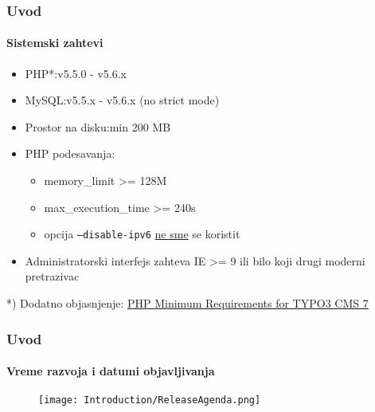\begin{frame}[fragile]
	\frametitle{Uvod}
	\framesubtitle{Sistemski zahtevi}

	\begin{itemize}
		\item PHP*:\tabto{3cm}v5.5.0 - v5.6.x
		\item MySQL:\tabto{3cm}v5.5.x - v5.6.x (no strict mode)
		\item Prostor na disku:\tabto{3cm}min 200 MB
		\item PHP podesavanja:

			\begin{itemize}
				\item memory\_limit >= 128M
				\item max\_execution\_time >= 240s
				\item opcija \texttt{--disable-ipv6} \underline{ne sme} se koristit
			\end{itemize}

		\item Administratorski interfejs zahteva IE >= 9 ili bilo koji drugi moderni pretrazivac

	\end{itemize}

	\vspace{1cm}
	*) Dodatno objasnjenje: \href{http://typo3.org/news/article/php-minimum-requirements-for-typo3-cms-7/}{PHP Minimum Requirements for TYPO3 CMS 7}

\end{frame}

\begin{frame}[fragile]
	\frametitle{Uvod}
	\framesubtitle{Vreme razvoja i datumi objavljivanja}

	\begin{figure}
		\texttt{[image: Introduction/ReleaseAgenda.png]}
	\end{figure}

\end{frame}


